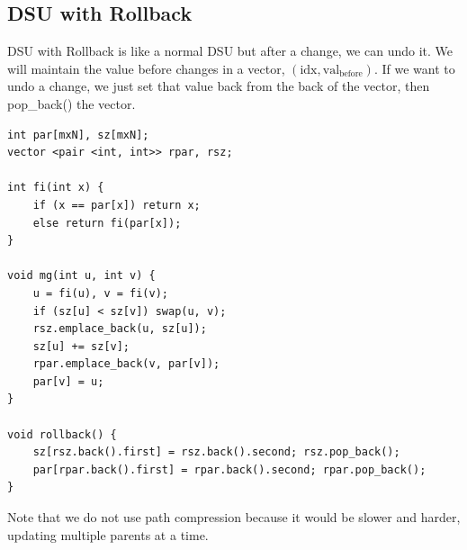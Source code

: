 \subsection{DSU with Rollback}

DSU with Rollback is like a normal DSU but after a change, we can undo it. We will maintain the value before changes in a vector, $(\text{idx}, \text{val}_\text{before})$. If we want to undo a change, we just set that value back from the back of the vector, then pop\_back() the vector.

\begin{lstlisting}
int par[mxN], sz[mxN];
vector <pair <int, int>> rpar, rsz;

int fi(int x) {
    if (x == par[x]) return x;
    else return fi(par[x]);
}

void mg(int u, int v) {
    u = fi(u), v = fi(v);
    if (sz[u] < sz[v]) swap(u, v);
    rsz.emplace_back(u, sz[u]);
    sz[u] += sz[v];
    rpar.emplace_back(v, par[v]);
    par[v] = u;
}

void rollback() {
    sz[rsz.back().first] = rsz.back().second; rsz.pop_back();
    par[rpar.back().first] = rpar.back().second; rpar.pop_back();
}
\end{lstlisting}

Note that we do not use path compression because it would be slower and harder, updating multiple parents at a time.

\break
